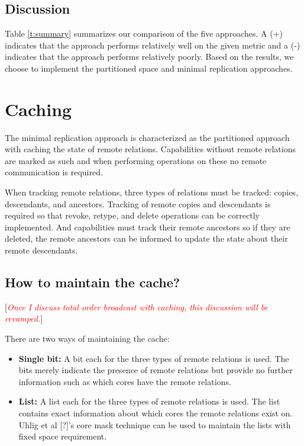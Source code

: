 \documentclass[a4paper,twoside]{report} %
\newcommand{\note}[1]{[\textcolor{red}{\textit{#1}}]}
\begin{document}
\subsection{Discussion}
Table \ref{t:summary} summarizes our comparison of the five
approaches. A (+) indicates that the approach performs relatively well
on the given metric and a (-) indicates that the approach performs
relatively poorly. Based on the results, we choose to implement the
partitioned space and minimal replication approaches.

\section{Caching}\label{sec:cache}
The minimal replication approach is characterized as the partitioned
approach with caching the state of remote relations. Capabilities
without remote relations are marked as such and when performing
operations on these no remote communication is required.

When tracking remote relations, three types of relations must be
tracked: copies, descendants, and ancestors. Tracking of remote copies
and descendants is required so that revoke, retype, and delete
operations can be correctly implemented. And capabilities must track
their remote ancestors so if they are deleted, the remote ancestors
can be informed to update the state about their remote descendants.

\subsection{How to maintain the cache?}

\note{Once I discuss total order broadcast with caching, this
  discussion will be revamped.}

There are two ways of maintaining the cache:
\begin{itemize}
\item \textbf{Single bit:} A bit each for the three types of remote
  relations is used. The bits merely indicate the presence of remote
  relations but provide no further information such as which cores
  have the remote relations.

\item \textbf{List:} A list each for the three types of remote
  relations is used. The list contains exact information about which
  cores the remote relations exist on. Uhlig et al [?]'s core mask
  technique can be used to maintain the lists with fixed space
  requirement.
\end{itemize}
\end{document}
